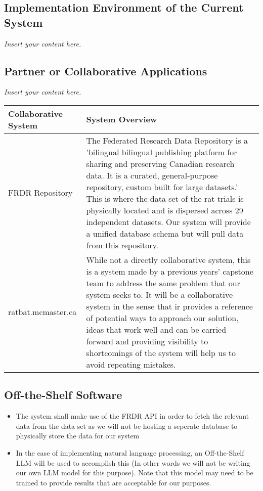 \documentclass[12pt]{article}
\newcommand{\lips}{\textit{Insert your content here.}}
\begin{document}
\subsection{Implementation Environment of the Current System}
\lips
\subsection{Partner or Collaborative Applications}
\lips

\begin{tabular}{|m{5cm}|m{10cm}|}
    \hline
    Collaborative System & System Overview \\
    \hline
    FRDR Repository & The Federated Research Data Repository is a 'bilingual bilingual publishing 
    platform for sharing and 
    preserving Canadian research data. 
    It is a curated, general-purpose repository, 
    custom built for large datasets.' This is where the data set of the rat trials is physically located
    and is dispersed across 29 independent datasets. Our system will provide a unified database schema but will
    pull data from this repository.\\
    \hline
    ratbat.mcmaster.ca & While not a directly collaborative system, this is a system made by a previous years' capstone
    team to address the same problem that our system seeks to. It will be a collaborative system in the sense that ir provides
    a reference of potential ways to approach our solution, ideas that work well and can be carried forward
    and providing visibility to shortcomings of the system will help us to avoid repeating mistakes. \\
    \hline
\end{tabular}

\subsection{Off-the-Shelf Software}

\begin{itemize}
    \item The system shall make use of the FRDR API in order to fetch the relevant data from the data set as we will not be hosting a seperate database to physically store the data for our system
    \item In the case of implementing natural language processing, an Off-the-Shelf LLM will be used to accomplish this (In other words we will not be writing our own LLM model for this purpose).
    Note that this model may need to be trained to provide results that are acceptable for our purposes.
\end{itemize}
\end{document}
